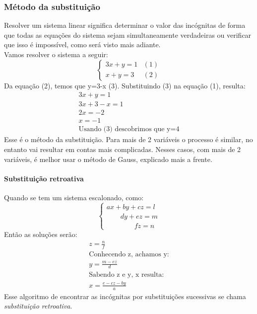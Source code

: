 \subsubsection*{Método da substituição}
  Resolver um sistema linear significa determinar o valor das incógnitas de forma que todas as equações do sistema sejam simultaneamente verdadeiras ou verificar que isso é impossível, como será visto mais adiante.\\
  Vamos resolver o sistema a seguir:
  \[
  \left\lbrace
  \begin{array}{lr}
  3x+y=1 & (1)\\
  x+y=3 & (2)  
  \end{array}
  \right.
  \]
Da equação (2), temos que y=3-x (3). Substituindo (3) na equação (1), resulta:
\[\begin{array}{l}
3x+y=1\\
3x+3-x=1\\
2x=-2 \\
x=-1\\
\text{Usando (3) descobrimos que y=4}
\end{array}
\]
Esse é o método da substituição. Para mais de 2 variáveis o processo é similar, no entanto vai resultar em contas mais complicadas. Nesses casos, com mais de 2 variáveis, é melhor usar o método de Gauss, explicado mais a frente.
\paragraph*{Substituição retroativa}
Quando se tem um sistema escalonado, como:
\begin{equation*}
\left\lbrace
\begin{array}{l}
ax+by+cz=l\\
\qquad dy+ez=m\\
\qquad \qquad fz=n
\end{array}
\right.
\end{equation*}
Então as soluções serão:
\begin{equation*}
  \begin{array}{l}
    z=\frac{\displaystyle n}{\displaystyle f}\\
    \text{Conhecendo z, achamos y:}\\
    y=\frac{\displaystyle m-ez}{\displaystyle d}\\
    \text{Sabendo z e y, x resulta:}\\
    x=\frac{\displaystyle e-cz-by}{\displaystyle a}
  \end{array}
\end{equation*}
Esse algoritmo de encontrar as incógnitas por substituições sucessivas se chama \textit{substituição retroativa}.
